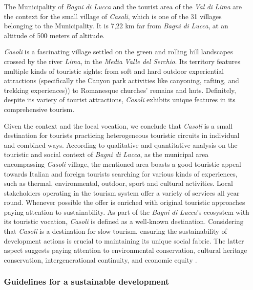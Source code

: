\documentclass[sustainability,article,submit,pdftex,moreauthors]{Definitions/mdpi}
\begin{document}
The Municipality of \emph{Bagni di Lucca} and the tourist area of the \emph{Val di Lima} are the context for the small village of \emph{Casoli}, which is one of the 31 villages belonging to the Municipality. It is 7,22 km far from \emph{Bagni di Lucca}, at an altitude of 500 meters of altitude.

\emph{Casoli} is a fascinating village settled on the green and rolling hill landscapes crossed by the river \emph{Lima}, in the \emph{Media Valle del Serchio}. Its territory features multiple kinds of touristic sights: from soft and hard outdoor experiential attractions (specifically the Canyon park activities like canyoning, rafting, and trekking experiences)) to Romanesque churches’ remains and huts. Definitely, despite its variety of tourist attractions, \emph{Casoli} exhibits unique features in its comprehensive tourism.


Given the context and the local vocation, we conclude that \emph{Casoli} is a small destination for tourists practicing heterogeneous touristic circuits in individual and combined ways. According to qualitative and quantitative analysis \cite{loz09} on the touristic and social context of \emph{Bagni di Lucca}, as the municipal area encompassing \emph{Casoli} village, the mentioned area boasts a good touristic appeal towards Italian and foreign tourists searching for various kinds of experiences, such as thermal, environmental, outdoor, sport and cultural activities. Local stakeholders operating in the tourism system offer a variety of services all year round. Whenever possible the offer is enriched with original touristic approaches paying attention to sustainability. As part of the \emph{Bagni di Lucca}’s ecosystem with its touristic vocation, \emph{Casoli} is defined as a well-known destination. Considering that \emph{Casoli} is a destination for slow tourism, ensuring the sustainability of development actions is crucial to maintaining its unique social fabric. The latter aspect suggests paying attention to environmental conservation, cultural heritage conservation, intergenerational continuity, and economic equity \cite{kuh10}.

\subsubsection{Guidelines for a sustainable development}
\end{document}
